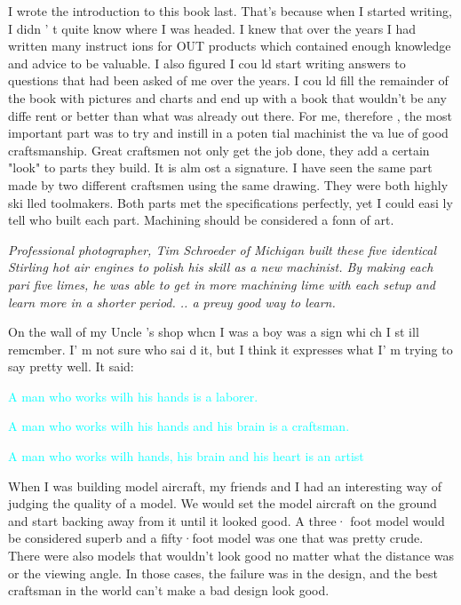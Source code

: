 \secdown{}\secdown


I wrote the introduction to this book last. That's
because when I started writing, I didn ' t quite know
where I was headed. I knew that over the years I
had written many instruct ions for OUT products which
contained enough knowledge and advice to be
valuable. I also figured I cou ld start writing answers
to questions that had been asked of me over the
years. I cou ld fill the remainder of the book with
pictures and charts and end up with a book that
wouldn't be any diffe rent or better than what was
already out there. For me, therefore , the most
important part was to try and instill in a poten tial
machinist the va lue of good craftsmanship. Great
craftsmen not only get the job done, they add a
certain "look" to parts they build. It is alm ost a
signature. I have seen the same part made by two
different craftsmen using the same drawing. They
were both highly ski lled toolmakers. Both parts met
the specifications perfectly, yet I could easi ly tell
who built each part. Machining should be considered
a fonn of art.


\bigskip\textit{Professional photographer, Tim Schroeder of Michigan built these
five identical Stirling hot air engines to polish his skill as a new machinist.
By making each pari five limes, he was able to get in more machining lime with
each setup and learn more in a shorter period. .. a preuy good way to learn.
}\bigskip

On the wall of my Uncle 's shop whcn I was a boy
was a sign whi ch I st ill remcmber. I' m not sure who
sai d it, but I think it expresses what I' m trying to
say pretty well. It said:

\bigskip
\textcolor{Cyan}{A man who works wilh his hands is a laborer.}

\bigskip
\textcolor{Cyan}{A man who works wilh his hands and his brain
is a craftsman.}

\bigskip
\textcolor{Cyan}{A man who works wilh hands, his brain and
his heart is an artist}

When I was building model aircraft, my friends and I had an interesting way of
judging the quality of a model. We would set the model aircraft on the ground
and start backing away from it until it looked good. A three· foot model would
be considered superb and a fifty·foot model was one that was pretty crude. There
were also models that wouldn't look good no matter what the distance was or the
viewing angle. In those cases, the failure was in the design, and the best
craftsman in the world can't make a bad design look good.

